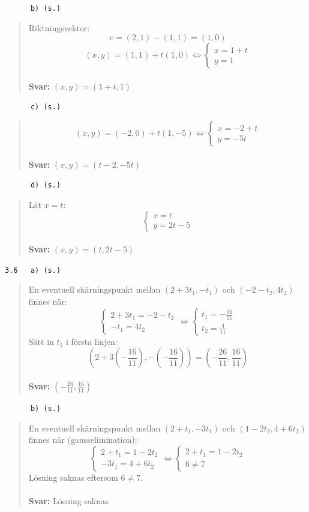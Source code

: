 \documentclass[a4paper]{article}
\newcommand{\tskcol}[1]{\textcolor{tskcol}{#1}}
\begin{document}
\texttt{\tskcol{~~~~~~b) (s.)}}
\begin{quotation}
	\noindent
	Riktningsvektor:
	\[v=(2,1)-(1,1)=(1,0)\]
	\[(x,y)=(1,1)+t(1,0) \Leftrightarrow
	\begin{cases}
	x=1+t \\
	y=1
	\end{cases}\]
	\\
	\textbf{Svar:} $(x,y)=(1+t,1)$
\end{quotation}

\texttt{\tskcol{~~~~~~c) (s.)}}
\begin{quotation}
	\noindent
	\[(x,y)=(-2,0)+t(1,-5) \Leftrightarrow
	\begin{cases}
	x=-2+t \\
	y=-5t
	\end{cases}\]
	\\
	\textbf{Svar:} $(x,y)=(t-2,-5t)$
\end{quotation}

\texttt{\tskcol{~~~~~~d) (s.)}}
\begin{quotation}
	\noindent
	Låt $x=t$:
	\[\begin{cases}
	x=t \\
	y=2t-5
	\end{cases}\]
	\\
	\textbf{Svar:} $(x,y)=(t,2t-5)$
\end{quotation}

\texttt{\tskcol{3.6~~~a) (s.)}}
\begin{quotation}
	\noindent
	En eventuell skärningspunkt mellan $(2+3t_1,-t_1)$ och $(-2-t_2,4t_2)$ finnes när:
	\[\begin{cases}
	2+3t_1=-2-t_2 \\
	-t_1=4t_2
	\end{cases} \Leftrightarrow
	\begin{cases}
	t_1=-\frac{16}{11} \\
	t_2=\frac{4}{11}
	\end{cases}\]
	Sätt in $t_1$ i första linjen:
	\[(2+3(-\frac{16}{11}),-(-\frac{16}{11}))=(-\frac{26}{11},\frac{16}{11})\]
	\\
	\textbf{Svar:} $(-\frac{26}{11},\frac{16}{11})$
\end{quotation}

\texttt{\tskcol{~~~~~~b) (s.)}}
\begin{quotation}
	\noindent
	En eventuell skärningspunkt mellan $(2+t_1,-3t_1)$ och $(1-2t_2,4+6t_2)$ finnes när (gausselimination):
	\[\begin{cases}
	2+t_1=1-2t_2 \\
	-3t_1=4+6t_2
	\end{cases} \Leftrightarrow
	\begin{cases}
	2+t_1=1-2t_2 \\
	6\neq7
	\end{cases}\]
	Lösning saknas eftersom $6\neq7$.
	\\ \\
	\textbf{Svar:} Lösning saknas
\end{quotation}
\end{document}
